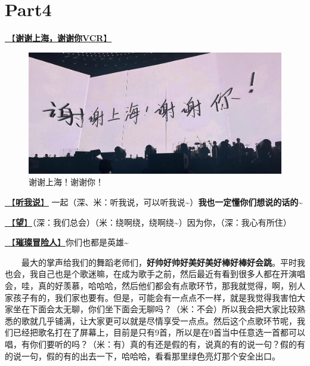 \documentclass[]{ctexbook}
\begin{document}
\section{Part4}\label{shanghai-20240518-part4}

\hyperref[thank-you-vcr]{🎥【\textbf{谢谢上海，谢谢你VCR}】}

\begin{figure}

{\centering \includegraphics[width=400pt]{img/shanghai20240518/thank-shanghai} 

}

\caption{谢谢上海！谢谢你！}\label{fig:unnamed-chunk-34}
\end{figure}

\hyperref[listen-to-me]{🎵【\textbf{听我说}】} 一起（深、米：听我说，可以听我说\textasciitilde）\textbf{我也一定懂你们想说的话的\textasciitilde{}}

\hyperref[hope]{🎵【\textbf{望}】}（深：我们总会）（米：绕啊绕，绕啊绕\textasciitilde）因为你，（深：我心有所住）

\hyperref[adventurers]{🎵【\textbf{璀璨冒险人}】}你们也都是英雄\textasciitilde{}

  最大的掌声给我们的舞蹈老师们，\textbf{好帅好帅好美好美好棒好棒好会跳}。平时我也会，我自己也是个歌迷嘛，在成为歌手之前，然后最近有看到很多人都在开演唱会，哇，真的好羡慕，哈哈哈，然后他们都会有点歌环节，那我就觉得，啊，别人家孩子有的，我们家也要有。但是，可能会有一点点不一样，就是我觉得我害怕大家坐在下面会太无聊，你们坐下面会无聊吗？（米：不会）所以我会把大家比较熟悉的歌就几乎铺满，让大家更可以就是尽情享受一点点。然后这个点歌环节呢，我们已经把歌名打在了屏幕上，目前是只有9首，所以是在9首当中任意选一首都可以唱，有你们要听的吗？（米：有）真的有还是假的有，说真的有的说一句？假的有的说一句，假的有的出去一下，哈哈哈，看看那里绿色亮灯那个安全出口。
\end{document}
